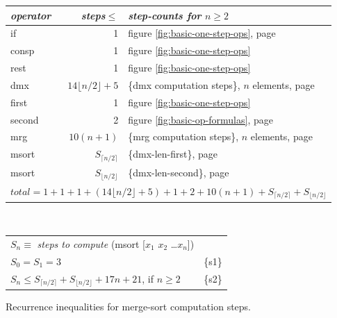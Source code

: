 \begin{figure}
\begin{center}
\begin{spacing}{0.9}
\begin{tabular}{lrl}
  \emph{operator} & \emph{steps}$\leq$ & \emph{step-counts for} $n \geq 2$\\
  \hline
   \textsf{if}     & 1 & figure \ref{fig:basic-one-step-ops}, page \pageref{fig:basic-one-step-ops}  \\
   \textsf{consp}  & 1 & figure \ref{fig:basic-one-step-ops}  \\
   \textsf{rest}   & 1 & figure \ref{fig:basic-one-step-ops} \\
   \textsf{dmx}    & $14\lfloor n/2\rfloor + 5$ & \{dmx computation steps\}, $n$ elements, page \pageref{fig:dmx-computation-time}\\
   \textsf{first}  & 1 & figure \ref{fig:basic-one-step-ops} \\
   \textsf{second} & 2 & figure \ref{fig:basic-op-formulas}, page \pageref{fig:basic-op-formulas} \\
   \textsf{mrg}    & $10(n+1)$ & \{mrg computation steps\}, $n$ elements, page \pageref{thm:mrg-computation-time}\\
   \textsf{msort}  & $S_{\lceil  n/2 \rceil}$  & \{dmx-len-first\}, page \pageref{thm:dmx-length-first-second} \\
   \textsf{msort}  & $S_{\lfloor n/2 \rfloor}$ & \{dmx-len-second\}, page \pageref{thm:dmx-length-first-second} \vspace{5pt} \\
   \hline
	\multicolumn{3}{c}{$total = 1+1+1+(14\lfloor n/2\rfloor+5)+1+2+10(n+1)+S_{\lceil n/2\rceil}+S_{\lfloor n/2\rfloor}$} \vspace{1pt} \\
   \hline
\end{tabular}
\end{spacing}
~\vspace{2mm}\\
\begin{tabular}{ll}
   $S_n \equiv$ \emph{steps to compute} \textsf{(msort [$x_1$ $x_2$ \dots $x_n$])} \\
   $S_0 = S_1 = 3$ & \{s1\}\\
   $S_{n} \leq S_{\lceil n/2 \rceil} + S_{\lfloor n/2 \rfloor} + 17n + 21$, if $n \geq 2$ & \{s2\}\\
\end{tabular}
\end{center}
\caption{Recurrence inequalities for merge-sort computation steps.}
\label{msort-recurrences}
\end{figure}

